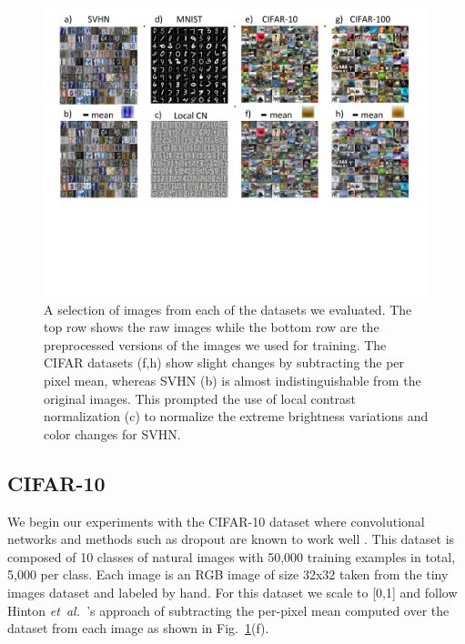 \documentclass{article} %
\newcommand{\fig}[1]{Fig.~\ref{fig:#1}}
\def\etal{{\textit{et~al.~}}}
\begin{document}
\begin{figure}[t!]
\begin{center}
\includegraphics[width=5.5in]{datasets.pdf}
\end{center}
\vspace*{-0.4cm}
\caption{A selection of images from each of the datasets we
  evaluated. The top row shows the raw images while the bottom row are
  the preprocessed versions of the images we used for training. The
  CIFAR datasets (f,h) show slight changes by subtracting the per
  pixel mean, whereas SVHN (b) is almost indistinguishable from the
  original images. This prompted the use of local contrast
  normalization (c) to normalize the extreme brightness variations and
  color changes for SVHN.}
\label{fig:datasets}
\vspace*{-0.4cm}
\end{figure}

\subsection{CIFAR-10}
We begin our experiments with the CIFAR-10 dataset where
convolutional networks and methods such as dropout are known to work
well \cite{Hinton12,Kriz09}. This dataset is composed of 10 classes of
natural images with 50,000 training examples in total, 5,000 per
class. Each image is an RGB image of size 32x32 taken from the tiny
images dataset and labeled by hand. For this dataset we scale to [0,1] and follow Hinton \etal's \cite{Hinton12}
approach of subtracting the per-pixel mean computed over the dataset from each image as shown
in \fig{datasets}(f).
\end{document}
